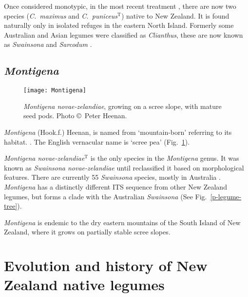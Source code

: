 Once considered monotypic, in the most recent treatment
\citep{Heenan95c,Heenan00}, there are now two species
(\emph{C.~maximus} and \emph{C.~puniceus}$^{\mathrm{T}}$) native to
New Zealand. It is found naturally only in isolated refuges in the
eastern North Island. Formerly some Australian and Asian legumes
were classified as \emph{Clianthus}, these are now known as
\emph{Swainsona} and \emph{Sarcodum} \citep{ILDIS}.





\subsection{\emph{Montigena}}

\begin{figure} [tb]
    \centering
    \texttt{[image: Montigena]}
    \caption[\emph{Montigena novae-zelandiae}]{\emph{Montigena
    novae-zelandiae}, growing on a scree slope,
     with mature seed pods. Photo \copyright\ Peter Heenan.}
    \label{p-Montigena}
\end{figure}

\emph{Montigena} (Hook.f.) Heenan, is named from `mountain-born'
referring to its habitat. \citep{Heenan98d}. The English vernacular
name is `scree pea' (Fig.~\ref{p-Montigena}).

\emph{Montigena novae-zelandiae}$^{\mathrm{T}}$ is the only species
in the \emph{Montigena} genus. It was known as \emph{Swainsona
novae-zelandiae} until \citet{Heenan98d} reclassified it based on
morphological features. There are currently 55 \emph{Swainsona}
species, mostly in Australia \citep{ILDIS}. \emph{Montigena} has a
distinctly different ITS sequence from other New Zealand legumes,
but forms a clade with the Australian \emph{Swainsona}
\citep{Wagstaff99} (See Fig.~\ref{p-legume-tree}).

\emph{Montigena} is endemic to the dry eastern mountains of the
South Island of New Zealand, where it grows on partially stable
scree slopes.




\section{Evolution and history of New Zealand native legumes} \label{legume-history}

